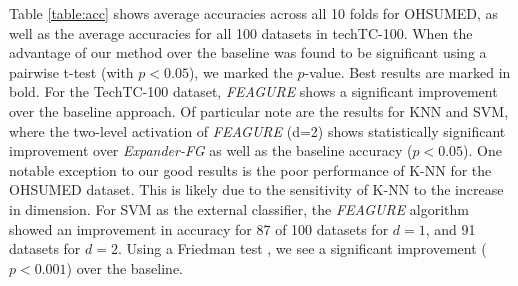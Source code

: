\documentclass[letterpaper]{article} %
\theoremstyle{definition}
\begin{document}
Table \ref{table:acc} shows average accuracies across all 10 folds for OHSUMED, as well as the average accuracies for all 100 datasets in techTC-100. When the advantage of our method over the baseline was found to be significant using a pairwise t-test (with $p<0.05$), we marked the $p$-value. Best results are marked in bold.
For the TechTC-100 dataset, \emph{FEAGURE} shows a significant improvement over the baseline approach. %
Of particular note are the results for KNN and SVM, where the two-level activation of \emph{FEAGURE} (d=2) shows statistically significant improvement over \emph{Expander-FG} as well as the baseline accuracy ($p < 0.05$). 
One notable exception to our good results is the poor performance of K-NN for the OHSUMED dataset. This is likely due to the sensitivity of K-NN to the increase in dimension. 
For SVM as the external classifier, the \emph{FEAGURE} algorithm showed an improvement in accuracy for 87 of 100 datasets for $d=1$, and 91 datasets for $d=2$.
Using a Friedman test \cite{friedman1937use}, we see a significant improvement ($p<0.001$) over the baseline.

\end{document}
